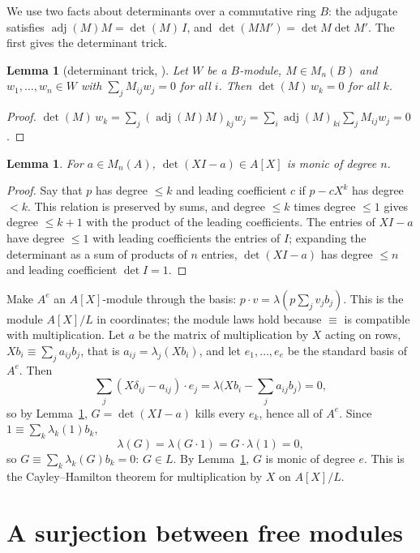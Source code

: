 \documentclass[11pt]{amsart}
\newtheorem{lemma}[theorem]{Lemma}
\theoremstyle{remark}
\begin{document}
We use two facts about determinants over a commutative ring $B$: the
adjugate satisfies $\operatorname{adj}(M)M=\det(M)\,I$, and
$\det(MM')=\det M\det M'$. The first gives the determinant trick.

\begin{lemma}[determinant trick, {\cite[Prop.~2.4]{AM}}]\label{lem:trick}
Let $W$ be a $B$-module, $M\in M_n(B)$ and $w_1,\dots,w_n\in W$ with
$\sum_jM_{ij}w_j=0$ for all $i$. Then $\det(M)\,w_k=0$ for all $k$.
\end{lemma}

\begin{proof}
$\det(M)\,w_k=\sum_j(\operatorname{adj}(M)M)_{kj}w_j
=\sum_i\operatorname{adj}(M)_{ki}\sum_jM_{ij}w_j=0$.
\end{proof}

\begin{lemma}\label{lem:monic}
For $a\in M_n(A)$, $\det(XI-a)\in A[X]$ is monic of degree $n$.
\end{lemma}

\begin{proof}
Say that $p$ has degree $\le k$ and leading coefficient $c$ if $p-cX^k$ has
degree $<k$. This relation is preserved by sums, and degree $\le k$ times
degree $\le1$ gives degree $\le k+1$ with the product of the leading
coefficients. The entries of $XI-a$ have degree $\le1$ with leading
coefficients the entries of $I$; expanding the determinant as a sum of
products of $n$ entries, $\det(XI-a)$ has degree $\le n$ and leading
coefficient $\det I=1$.
\end{proof}

Make $A^e$ an $A[X]$-module through the basis: $p\cdot v=\lambda(p\sum_jv_jb_j)$.
This is the module $A[X]/L$ in coordinates; the module laws hold because
$\equiv$ is compatible with multiplication. Let $a$ be the matrix of
multiplication by $X$ acting on rows, $Xb_i\equiv\sum_ja_{ij}b_j$, that is
$a_{ij}=\lambda_j(Xb_i)$, and let $e_1,\dots,e_e$ be the standard basis of
$A^e$. Then
\[
\textstyle\sum_j(X\delta_{ij}-a_{ij})\cdot e_j
=\lambda\bigl(Xb_i-\sum_ja_{ij}b_j\bigr)=0 ,
\]
so by Lemma~\ref{lem:trick}, $G=\det(XI-a)$ kills every $e_k$, hence all of
$A^e$. Since $1\equiv\sum_k\lambda_k(1)b_k$,
\[
\lambda(G)=\lambda(G\cdot1)=G\cdot\lambda(1)=0 ,
\]
so $G\equiv\sum_k\lambda_k(G)b_k=0$: $G\in L$. By Lemma~\ref{lem:monic}, $G$
is monic of degree $e$. This is the Cayley--Hamilton theorem for
multiplication by $X$ on $A[X]/L$.

\section{A surjection between free modules}\label{sec:cramer}
\end{document}
